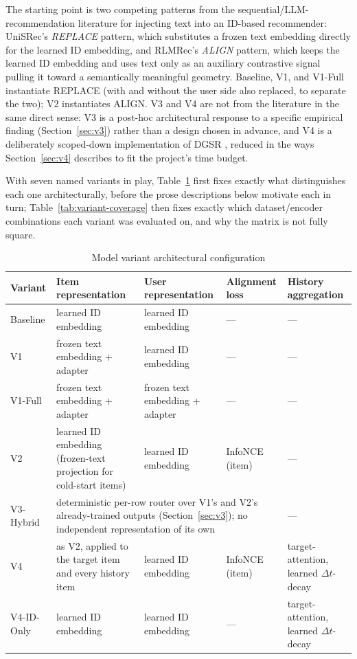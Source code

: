 The starting point is two competing patterns from the sequential/LLM-recommendation literature for injecting text into an ID-based recommender: UniSRec's \cite{hou2022unisrec} \emph{REPLACE} pattern, which substitutes a frozen text embedding directly for the learned ID embedding, and RLMRec's \cite{ren2024rlmrec} \emph{ALIGN} pattern, which keeps the learned ID embedding and uses text only as an auxiliary contrastive signal pulling it toward a semantically meaningful geometry. Baseline, V1, and V1-Full instantiate REPLACE (with and without the user side also replaced, to separate the two); V2 instantiates ALIGN. V3 and V4 are not from the literature in the same direct sense: V3 is a post-hoc architectural response to a specific empirical finding (Section~\ref{sec:v3}) rather than a design chosen in advance, and V4 is a deliberately scoped-down implementation of DGSR \cite{zhang2022dgsr}, reduced in the ways Section~\ref{sec:v4} describes to fit the project's time budget.

With seven named variants in play, Table~\ref{tab:variant-config} first fixes exactly what distinguishes each one architecturally, before the prose descriptions below motivate each in turn; Table~\ref{tab:variant-coverage} then fixes exactly which dataset/encoder combinations each variant was evaluated on, and why the matrix is not fully square.

\begin{table}[h]
\centering
\caption{Model variant architectural configuration}
\label{tab:variant-config}
\begin{tabular}{lp{3.1cm}p{3.1cm}p{2.1cm}p{2.4cm}}
\toprule
Variant & Item representation & User representation & Alignment loss & History aggregation \\
\midrule
Baseline & learned ID embedding & learned ID embedding & --- & --- \\
V1 & frozen text embedding + adapter & learned ID embedding & --- & --- \\
V1-Full & frozen text embedding + adapter & frozen text embedding + adapter & --- & --- \\
V2 & learned ID embedding (frozen-text projection for cold-start items) & learned ID embedding & InfoNCE (item) & --- \\
V3-Hybrid & \multicolumn{3}{l}{deterministic per-row router over V1's and V2's already-trained outputs (Section~\ref{sec:v3}); no independent representation of its own} & --- \\
V4 & as V2, applied to the target item and every history item & learned ID embedding & InfoNCE (item) & target-attention, learned $\Delta t$-decay \\
V4-ID-Only & learned ID embedding & learned ID embedding & --- & target-attention, learned $\Delta t$-decay \\
\bottomrule
\end{tabular}
\end{table}

